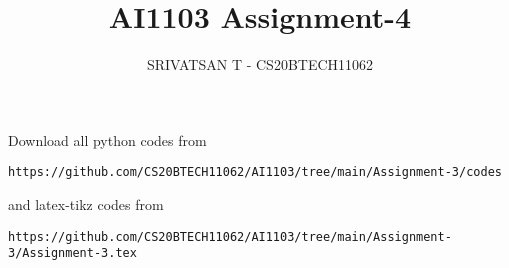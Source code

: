 \documentclass[journal,12pt,twocolumn]{IEEEtran}
\DeclareMathOperator*{\Res}{Res}
\begin{document}
\newcommand{\BEQA}{\begin{eqnarray}}
        \newcommand{\EEQA}{\end{eqnarray}}
\newcommand{\define}{\stackrel{\triangle}{=}}

\raggedbottom
\setlength{\parindent}{0pt}
\providecommand{\mbf}{\mathbf}
\providecommand{\pr}[1]{\ensuremath{\Pr\left(#1\right)}}
\providecommand{\qfunc}[1]{\ensuremath{Q\left(#1\right)}}
\providecommand{\sbrak}[1]{\ensuremath{{}\left[#1\right]}}
\providecommand{\lsbrak}[1]{\ensuremath{{}\left[#1\right.}}
\providecommand{\rsbrak}[1]{\ensuremath{{}\left.#1\right]}}
\providecommand{\brak}[1]{\ensuremath{\left(#1\right)}}
\providecommand{\lbrak}[1]{\ensuremath{\left(#1\right.}}
\providecommand{\rbrak}[1]{\ensuremath{\left.#1\right)}}
\providecommand{\cbrak}[1]{\ensuremath{\left\{#1\right\}}}
\providecommand{\lcbrak}[1]{\ensuremath{\left\{#1\right.}}
\providecommand{\rcbrak}[1]{\ensuremath{\left.#1\right\}}}
\theoremstyle{remark}
\newtheorem{rem}{Remark}
\newcommand{\sgn}{\mathop{\mathrm{sgn}}}
\providecommand{\abs}[1]{\vert#1\vert}
\providecommand{\res}[1]{\Res\displaylimits_{#1}}
\providecommand{\norm}[1]{\lVert#1\rVert}
\providecommand{\mtx}[1]{\mathbf{#1}}
\providecommand{\mean}[1]{E[#1]}
\providecommand{\fourier}{\overset{\mathcal{F}}{ \rightleftharpoons}}
\providecommand{\system}{\overset{\mathcal{H}}{ \longleftrightarrow}}
\newcommand{\solution}{\noindent \textbf{Solution: }}
\newcommand{\cosec}{\,\text{cosec}\,}
\providecommand{\dec}[2]{\ensuremath{\overset{#1}{\underset{#2}{\gtrless}}}}
\newcommand{\myvec}[1]{\ensuremath{\begin{pmatrix}#1\end{pmatrix}}}
\newcommand{\mydet}[1]{\ensuremath{\begin{vmatrix}#1\end{vmatrix}}}
\makeatletter
{}
\makeatother
\let\StandardTheFigure\thefigure
\let\vec\mathbf
\renewcommand{\thefigure}{\theproblem}
\def\putbox#1#2#3{\makebox[0in][l]{\makebox[#1][l]{}\raisebox{\baselineskip}[0in][0in]{\raisebox{#2}[0in][0in]{#3}}}}
\def\rightbox#1{\makebox[0in][r]{#1}}
\def\centbox#1{\makebox[0in]{#1}}
\def\topbox#1{\raisebox{-\baselineskip}[0in][0in]{#1}}
\def\midbox#1{\raisebox{-0.5\baselineskip}[0in][0in]{#1}}
\vspace{3cm}
\title{AI1103 Assignment-4}
\author{SRIVATSAN T - CS20BTECH11062}
\maketitle
\newpage
\bigskip
\renewcommand{\thefigure}{\theenumi}
\renewcommand{\thetable}{\theenumi}
Download all python codes from
\begin{lstlisting}
https://github.com/CS20BTECH11062/AI1103/tree/main/Assignment-3/codes
\end{lstlisting}
%
and latex-tikz codes from
%
\begin{lstlisting}
https://github.com/CS20BTECH11062/AI1103/tree/main/Assignment-3/Assignment-3.tex
\end{lstlisting}
\end{document}
